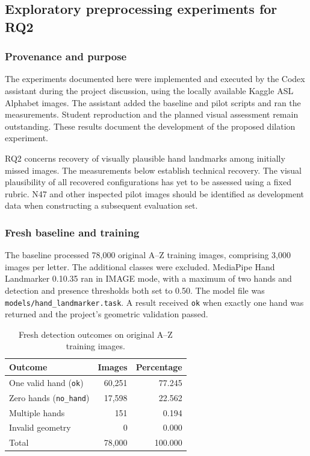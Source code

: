 \subsection{Exploratory preprocessing experiments for RQ2}
\label{app:rq2-pilot}

\subsubsection{Provenance and purpose}
The experiments documented here were implemented and executed by the Codex assistant during the project discussion, using the locally available Kaggle ASL Alphabet images. The assistant added the baseline and pilot scripts and ran the measurements. Student reproduction and the planned visual assessment remain outstanding. These results document the development of the proposed dilation experiment.

RQ2 concerns recovery of visually plausible hand landmarks among initially missed images. The measurements below establish technical recovery. The visual plausibility of all recovered configurations has yet to be assessed using a fixed rubric. N47 and other inspected pilot images should be identified as development data when constructing a subsequent evaluation set.

\subsubsection{Fresh baseline and training}
The baseline processed 78,000 original A--Z training images, comprising 3,000 images per letter. The additional classes were excluded. MediaPipe Hand Landmarker 0.10.35 ran in IMAGE mode, with a maximum of two hands and detection and presence thresholds both set to 0.50. The model file was \texttt{models/hand\_landmarker.task}. A result received \texttt{ok} when exactly one hand was returned and the project's geometric validation passed.

\begin{table}[ht]\centering
\caption{Fresh detection outcomes on original A--Z training images.}
\label{tab:rq2-baseline}
\begin{tabular}{lrr}\toprule
Outcome & Images & Percentage\\\midrule
One valid hand (\texttt{ok}) & 60,251 & 77.245\\
Zero hands (\texttt{no\_hand}) & 17,598 & 22.562\\
Multiple hands & 151 & 0.194\\
Invalid geometry & 0 & 0.000\\\midrule
Total & 78,000 & 100.000\\\bottomrule
\end{tabular}
\end{table}


